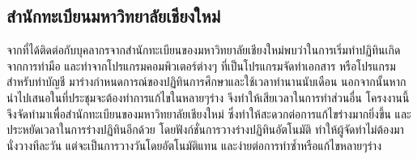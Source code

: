 \subsection{สำนักทะเบียนมหาวิทยาลัยเชียงใหม่ }
    จากที่ได้ติดต่อกับบุคลากรจากสำนักทะเบียนของมหาวิทยาลัยเชียงใหม่พบว่าในการเริ่มทำปฏิทินเกิดจากการทำมือ และทำจากโปรแกรมคอมพิวเตอร์ต่างๆ ที่เป็นโปรแกรมจัดทำเอกสาร
%
หรือโปรแกรมสำหรับทำบัญชี มาร่างกำหนดการณ์ของปฏิทินการศึกษาและใช้เวลาทำนานนับเดือน นอกจากนั้นหากนำไปเสนอในที่ประชุมจะต้องทำการแก้ไขในหลายๆร่าง จึงทำให้เสียเวลาในการทำส่วนอื่น
%
โครงงานนี้จึงจัดทำมาเพื่อสำนักทะเบียนของมหาวิทยาลัยเชียงใหม่ ซึ่งทำให้สะดวกต่อการแก้ไขร่างมากยิ่งขึ้น และประหยัดเวลาในการร่างปฏิทินอีกด้วย โดยฟังก์ชั่นการวางร่างปฏิทินอัตโนมัติ ทำให้ผู้จัดทำไม่ต้องมานั่งวางทีละวัน แต่จะเป็นการวางวันโดยอัตโนมัติแทน และง่ายต่อการทำซ้ำหรือแก้ไขหลายๆร่าง


